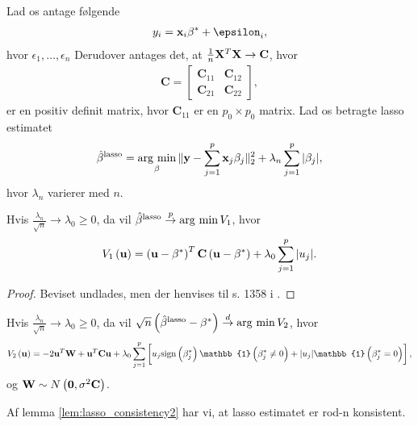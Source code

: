 Lad os antage følgende
\begin{align*}
y_i = \x_i \beta^* + \epsilon_i, 
\end{align*}
hvor \(\epsilon_1, \ldots, \epsilon_n\)
Derudover antages det, at \(\frac{1}{n} \mathbf{X}^T \mathbf{X} \rightarrow \textbf{C}\), hvor
\begin{align*}
\textbf{C} = 
\begin{bmatrix}
\textbf{C}_{11}& \textbf{C}_{12}\\
\textbf{C}_{21}& \textbf{C}_{22}
\end{bmatrix},
\end{align*}
er en positiv definit matrix, hvor $\textbf{C}_{11}$ er en $p_0 \times p_0$ matrix. 
Lad os betragte lasso estimatet
\begin{align*}
\hat{\beta}^\text{lasso} = \operatorname*{\arg\,\min}_\beta \Vert \mathbf{y} - \sum_{j=1}^p \mathbf{x}_j \beta_j \Vert_2^2 + \lambda_n \sum_{j=1}^p \vert \beta_j \vert,
\end{align*}
hvor \(\lambda_n\) varierer med \(n\).



%
\begin{lem}\label{lem:lasso_consistency1}
Hvis $\frac{\lambda_n}{\sqrt{n}} \rightarrow \lambda_0 \geq 0$, da vil $\hat{\beta}^\text{lasso} \overset{p}{\rightarrow} \operatorname*{\arg\,\min} V_1$, hvor
\begin{align*}
V_1 \del{\mathbf{u}} = \del{\mathbf{u} - \beta^*}^T \mathbf{C} \del{\mathbf{u} - \beta^*} + \lambda_0 \sum_{j=1}^p \vert u_j \vert.
\end{align*}
\end{lem}
\begin{proof}
Beviset undlades, men der henvises til s. 1358 i \citep{adaptive_lasso_knight}.
\end{proof}
%
\begin{lem}\label{lem:lasso_consistency2}
Hvis $\frac{\lambda_n}{\sqrt{n}} \rightarrow \lambda_0 \geq 0$, da vil \(\sqrt{n} \del{\hat{\beta}^\text{lasso} - \beta^*} \overset{d}{\rightarrow} \argmin V_2\), hvor
\begin{align*}
V_2 \del{\mathbf{u}} = -2 \mathbf{u}^T \mathbf{W} + \mathbf{u}^T \mathbf{C} \mathbf{u} + \lambda_0 \sum_{j=1}^p \sbr{u_j \text{sign} \del{\beta^*_j} \mathbb{1} \del{\beta_j^* \neq 0} + \vert u_j \vert \mathbb{1} \del{\beta_j^* = 0}},
\end{align*}
og \(\mathbf{W} \sim N\del{\mathbf{0}, \sigma^2 \mathbf{C}}\).
\end{lem}
%
Af lemma \ref{lem:lasso_consistency2} har vi, at lasso estimatet er rod-n konsistent.


